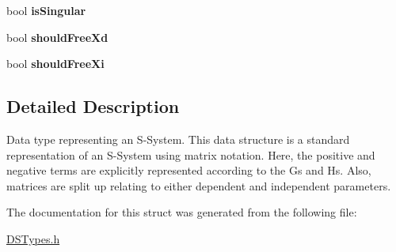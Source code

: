 \begin{DoxyCompactItemize}
\item 
\hypertarget{struct_d_s_s_system_a706afdc6a5b397e4bf95618eacb2e128}{
bool {\bfseries isSingular}}
\label{struct_d_s_s_system_a706afdc6a5b397e4bf95618eacb2e128}

\item 
\hypertarget{struct_d_s_s_system_a5663937709bfe1f95645a10a4c2b5ad8}{
bool {\bfseries shouldFreeXd}}
\label{struct_d_s_s_system_a5663937709bfe1f95645a10a4c2b5ad8}

\item 
\hypertarget{struct_d_s_s_system_ac4ed22f10fc35532616b1527ebe3ebad}{
bool {\bfseries shouldFreeXi}}
\label{struct_d_s_s_system_ac4ed22f10fc35532616b1527ebe3ebad}

\end{DoxyCompactItemize}


\subsection{Detailed Description}
Data type representing an S-\/System. This data structure is a standard representation of an S-\/System using matrix notation. Here, the positive and negative terms are explicitly represented according to the Gs and Hs. Also, matrices are split up relating to either dependent and independent parameters. 

The documentation for this struct was generated from the following file:\begin{DoxyCompactItemize}
\item 
\hyperlink{_d_s_types_8h}{DSTypes.h}\end{DoxyCompactItemize}
